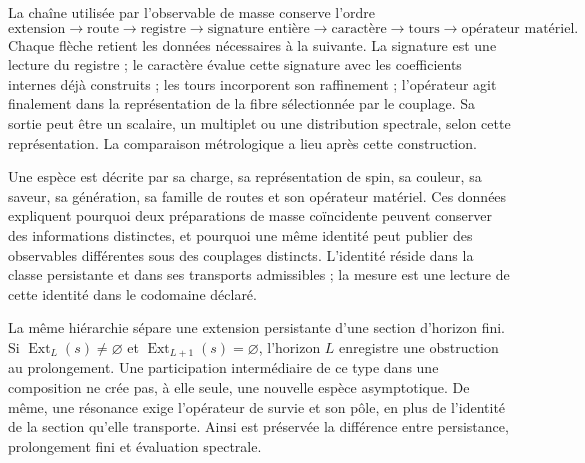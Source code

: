 La chaîne utilisée par l’observable de masse conserve l’ordre
\begin{equation}
 \text{extension}\longrightarrow\text{route}\longrightarrow
 \text{registre}\longrightarrow\text{signature entière}\longrightarrow
 \text{caractère}\longrightarrow\text{tours}\longrightarrow
 \text{opérateur matériel}.
 \label{vi:vi:eq:cadena-material}
\end{equation}
Chaque flèche retient les données nécessaires à la suivante. La signature est
une lecture du registre ; le caractère évalue cette signature avec les
coefficients internes déjà construits ; les tours incorporent son
raffinement ; l’opérateur agit finalement dans la représentation de la
fibre sélectionnée par le couplage. Sa sortie peut être un scalaire,
un multiplet ou une distribution spectrale, selon cette représentation.
La comparaison métrologique a lieu après cette construction.

Une espèce est décrite par sa charge, sa représentation de spin, sa couleur,
sa saveur, sa génération, sa famille de routes et son opérateur matériel. Ces données
expliquent pourquoi deux préparations de masse coïncidente peuvent
conserver des informations distinctes, et pourquoi une même identité peut
publier des observables différentes sous des couplages distincts.
L’identité réside dans la classe persistante et dans ses transports admissibles ;
la mesure est une lecture de cette identité dans le codomaine déclaré.

La même hiérarchie sépare une extension persistante d’une section
d’horizon fini. Si $\operatorname{Ext}_L(s)\ne\varnothing$ et
$\operatorname{Ext}_{L+1}(s)=\varnothing$, l’horizon $L$ enregistre
une obstruction au prolongement. Une participation intermédiaire de ce
type dans une composition ne crée pas, à elle seule, une nouvelle espèce
asymptotique. De même, une résonance exige l’opérateur de
survie et son pôle, en plus de l’identité de la section qu’elle
transporte. Ainsi est préservée la différence entre persistance,
prolongement fini et évaluation spectrale.
